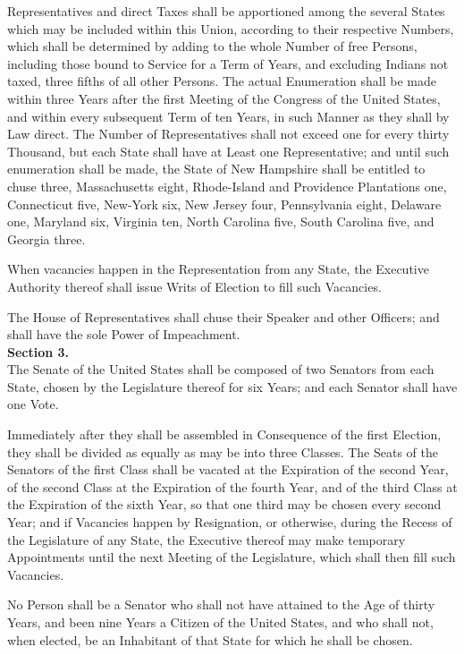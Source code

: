 Representatives and direct Taxes shall be apportioned among the several States which may be included within this Union, according to their respective Numbers, which shall be determined by adding to the whole Number of free Persons, including those bound to Service for a Term of Years, and excluding Indians not taxed, three fifths of all other Persons. The actual Enumeration shall be made within three Years after the first Meeting of the Congress of the United States, and within every subsequent Term of ten Years, in such Manner as they shall by Law direct. The Number of Representatives shall not exceed one for every thirty Thousand, but each State shall have at Least one Representative; and until such enumeration shall be made, the State of New Hampshire shall be entitled to chuse three, Massachusetts eight, Rhode-Island and Providence Plantations one, Connecticut five, New-York six, New Jersey four, Pennsylvania eight, Delaware one, Maryland six, Virginia ten, North Carolina five, South Carolina five, and Georgia three.

When vacancies happen in the Representation from any State, the Executive Authority thereof shall issue Writs of Election to fill such Vacancies.

The House of Representatives shall chuse their Speaker and other Officers; and shall have the sole Power of Impeachment.\\[0.01in]

{\large \textbf{Section 3.}}\\[0.01in]

The Senate of the United States shall be composed of two Senators from each State, chosen by the Legislature thereof for six Years; and each Senator shall have one Vote.

Immediately after they shall be assembled in Consequence of the first Election, they shall be divided as equally as may be into three Classes. The Seats of the Senators of the first Class shall be vacated at the Expiration of the second Year, of the second Class at the Expiration of the fourth Year, and of the third Class at the Expiration of the sixth Year, so that one third may be chosen every second Year; and if Vacancies happen by Resignation, or otherwise, during the Recess of the Legislature of any State, the Executive thereof may make temporary Appointments until the next Meeting of the Legislature, which shall then fill such Vacancies.

No Person shall be a Senator who shall not have attained to the Age of thirty Years, and been nine Years a Citizen of the United States, and who shall not, when elected, be an Inhabitant of that State for which he shall be chosen.


